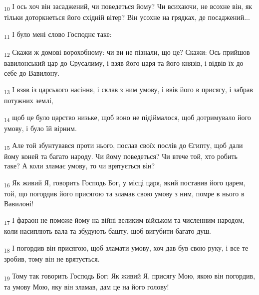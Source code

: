 \begin{tcolorbox}
\textsubscript{10} І ось хоч він засаджений, чи поведеться йому? Чи всихаючи, не всохне він, як тільки доторкнеться його східній вітер? Він усохне на грядках, де посаджений...
\end{tcolorbox}
\begin{tcolorbox}
\textsubscript{11} І було мені слово Господнє таке:
\end{tcolorbox}
\begin{tcolorbox}
\textsubscript{12} Скажи ж домові ворохобному: чи ви не пізнали, що це? Скажи: Ось прийшов вавилонський цар до Єрусалиму, і взяв його царя та його князів, і відвів їх до себе до Вавилону.
\end{tcolorbox}
\begin{tcolorbox}
\textsubscript{13} І взяв із царського насіння, і склав з ним умову, і ввів його в присягу, і забрав потужних землі,
\end{tcolorbox}
\begin{tcolorbox}
\textsubscript{14} щоб це було царство низьке, щоб воно не підіймалося, щоб дотримувало його умову, і було їй вірним.
\end{tcolorbox}
\begin{tcolorbox}
\textsubscript{15} Але той збунтувався проти нього, послав своїх послів до Єгипту, щоб дали йому коней та багато народу. Чи йому поведеться? Чи втече той, хто робить таке? А коли зламає умову, то чи врятується він?
\end{tcolorbox}
\begin{tcolorbox}
\textsubscript{16} Як живий Я, говорить Господь Бог, у місці царя, який поставив його царем, той, що погордив його присягою та зламав свою умову з ним, помре в нього в Вавилоні!
\end{tcolorbox}
\begin{tcolorbox}
\textsubscript{17} І фараон не поможе йому на війні великим військом та численним народом, коли насиплють вала та збудують башту, щоб вигубити багато душ.
\end{tcolorbox}
\begin{tcolorbox}
\textsubscript{18} І погордив він присягою, щоб зламати умову, хоч дав був свою руку, і все те зробив, тому він не врятується.
\end{tcolorbox}
\begin{tcolorbox}
\textsubscript{19} Тому так говорить Господь Бог: Як живий Я, присягу Мою, якою він погордив, та умову Мою, яку він зламав, дам це на його голову!
\end{tcolorbox}
